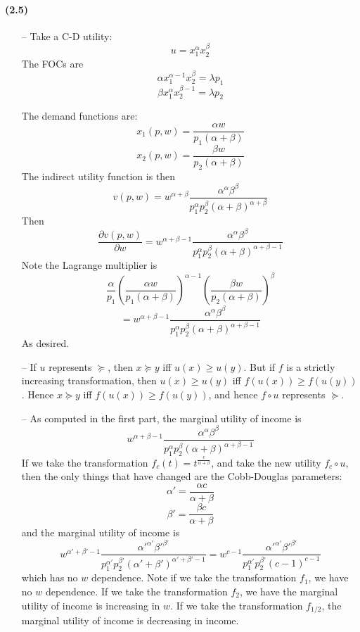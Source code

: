 \documentclass[10pt,letter]{article}
\begin{document}
\paragraph{(2.5)}
\begin{itemize}
\item[--] Take a C-D utility:
\[ u = x_1^\alpha x_2^{\beta} \]
The FOCs are
\[ \alpha x_1^{\alpha-1} x_2^{\beta} = \lambda p_1 \]
\[ \beta x_1^{\alpha} x_2^{\beta - 1} = \lambda p_2 \]

The demand functions are:
\[ x_1(p,w) = \frac{\alpha w}{p_1(\alpha + \beta)} \]
\[ x_2(p,w) = \frac{\beta w}{p_2(\alpha + \beta)} \]
The indirect utility function is then
\[ v(p,w) = w^{\alpha + \beta}\frac{\alpha^\alpha\beta^\beta }{p_1^\alpha p_2^{\beta} (\alpha + \beta)^{\alpha + \beta}}\]
Then
\[ \frac{\partial v(p,w)}{\partial w} = w^{\alpha + \beta - 1}\frac{\alpha^\alpha\beta^\beta }{p_1^\alpha p_2^{\beta}(\alpha + \beta)^{\alpha + \beta - 1}} \]
Note the Lagrange multiplier is
\[\frac{\alpha}{p_1} \left(\frac{\alpha w}{p_1(\alpha + \beta)}\right)^{\alpha-1}\left( \frac{\beta w}{p_2(\alpha + \beta)} \right)^{\beta}  \]
\[ = w^{\alpha + \beta - 1}\frac{\alpha^\alpha\beta^\beta }{p_1^\alpha p_2^{\beta} (\alpha + \beta)^{\alpha + \beta - 1}}  \]
As desired.
\item[--]
If $u$ represents $\succeq$, then $x \succeq y$ iff $u(x) \ge u(y)$. But if $f$ is a strictly increasing transformation, then $u(x) \ge u(y)$ iff $f(u(x)) \ge f(u(y))$. Hence $x \succeq y$ iff $f(u(x)) \ge f(u(y))$, and hence $f \circ u$ represents $\succeq$.
\item[--]
As computed in the first part, the marginal utility of income is
\[ w^{\alpha + \beta - 1}\frac{\alpha^\alpha\beta^\beta }{p_1^\alpha p_2^{\beta} (\alpha + \beta)^{\alpha + \beta - 1}} \]
If we take the transformation $f_c(t) = t^{\frac{c}{\alpha + \beta}}$, and take the new utility $f_c \circ u$, then the only things that have changed are the Cobb-Douglas parameters:
\[ \alpha' = \frac{\alpha c}{\alpha + \beta} \]
\[ \beta' = \frac{\beta c}{\alpha + \beta} \]
and the marginal utility of income is
\[ w^{\alpha' + \beta' - 1}\frac{\alpha'^{\alpha'}\beta'^{\beta'} }{p_1^{\alpha'} p_2^{\beta'} (\alpha' + \beta')^{\alpha' + \beta' - 1}}  = w^{c-1} \frac{\alpha'^{\alpha'}\beta'^{\beta'} }{p_1^{\alpha'} p_2^{\beta'} (c-1)^{c-1}}\]
which has no $w$ dependence. Note if we take the transformation $f_1$, we have no $w$ dependence. If we take the transformation $f_2$, we have the marginal utility of income is increasing in $w$. If we take the transformation $f_{1/2}$, the marginal utility of income is decreasing in income.

\end{itemize}
\end{document}
